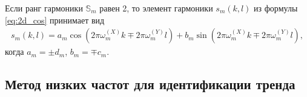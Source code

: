 \documentclass[specialist,
               substylefile = spbu.rtx,
               subf,href,colorlinks=true, 12pt]{disser}
\begin{document}
{{Если ранг гармоники $\mathbb{S}_m$ равен 2, то элемент гармоники $s_m(k,l)$ из формулы \eqref{eq:2d_cos} принимает вид
\begin{gather} \label{eq:2d_cos_rank2}
s_m(k,l)=a_m \cos(2\pi \omega_m^{(X)}k \mp 2\pi \omega_m^{(Y)}l) + b_m \sin(2\pi \omega_m^{(X)}k \mp 2\pi \omega_m^{(Y)}l),
\end{gather}
когда $a_m = \pm d_m$, $b_m = \mp c_m$.
%
%
%


\subsection{Метод низких частот для идентификации тренда}
\label{sec:freq_method_2d}

}}
\end{document}
